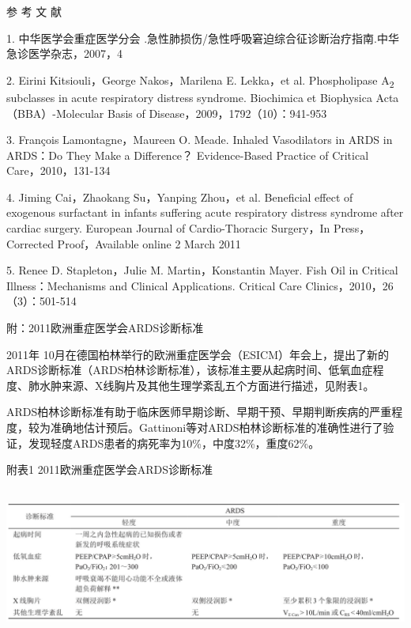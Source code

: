 \hypertarget{text00079.htmlux5cux23CHP3-5-6}{}
参 考 文 献

1. 中华医学会重症医学分会
.急性肺损伤/急性呼吸窘迫综合征诊断治疗指南.中华急诊医学杂志，2007，4

2. Eirini Kitsiouli，George Nakos，Marilena E. Lekka，et al.
Phospholipase A\textsubscript{2} subclasses in acute respiratory
distress syndrome. Biochimica et Biophysica Acta（BBA）-Molecular Basis
of Disease，2009，1792（10）：941-953

3. François Lamontagne，Maureen O. Meade. Inhaled Vasodilators in ARDS
in ARDS：Do They Make a Difference？ Evidence-Based Practice of Critical
Care，2010，131-134

4. Jiming Cai，Zhaokang Su，Yanping Zhou，et al. Beneficial effect of
exogenous surfactant in infants suffering acute respiratory distress
syndrome after cardiac surgery. European Journal of Cardio-Thoracic
Surgery，In Press，Corrected Proof，Available online 2 March 2011

5. Renee D. Stapleton，Julie M. Martin，Konstantin Mayer. Fish Oil in
Critical Illness：Mechanisms and Clinical Applications. Critical Care
Clinics，2010，26（3）：501-514

\protect\hypertarget{text00080.html}{}{}

\hypertarget{text00080.htmlux5cux23CHP3-5-7}{}
附：2011欧洲重症医学会ARDS诊断标准

2011年
10月在德国柏林举行的欧洲重症医学会（ESICM）年会上，提出了新的ARDS诊断标准（ARDS柏林诊断标准），该标准主要从起病时间、低氧血症程度、肺水肿来源、X线胸片及其他生理学紊乱五个方面进行描述，见附表1。

ARDS柏林诊断标准有助于临床医师早期诊断、早期干预、早期判断疾病的严重程度，较为准确地估计预后。Gattinoni等对ARDS柏林诊断标准的准确性进行了验证，发现轻度ARDS患者的病死率为10\%，中度32\%，重度62\%。

附表1 2011欧洲重症医学会ARDS诊断标准

\includegraphics[width=6.57292in,height=1.94792in]{./images/Image00116.jpg}

